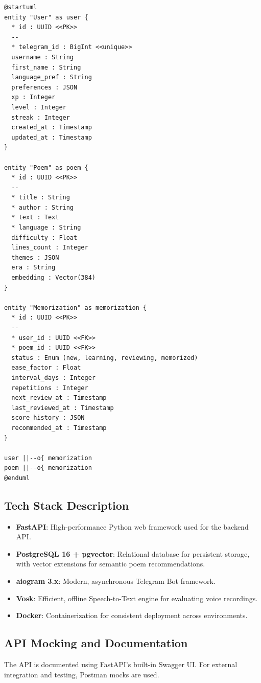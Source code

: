 \documentclass[12pt,a4paper]{article}
\begin{document}
\begin{lstlisting}[language=PlantUML, caption=PlantUML ERD Code]
@startuml
entity "User" as user {
  * id : UUID <<PK>>
  --
  * telegram_id : BigInt <<unique>>
  username : String
  first_name : String
  language_pref : String
  preferences : JSON
  xp : Integer
  level : Integer
  streak : Integer
  created_at : Timestamp
  updated_at : Timestamp
}

entity "Poem" as poem {
  * id : UUID <<PK>>
  --
  * title : String
  * author : String
  * text : Text
  * language : String
  difficulty : Float
  lines_count : Integer
  themes : JSON
  era : String
  embedding : Vector(384)
}

entity "Memorization" as memorization {
  * id : UUID <<PK>>
  --
  * user_id : UUID <<FK>>
  * poem_id : UUID <<FK>>
  status : Enum (new, learning, reviewing, memorized)
  ease_factor : Float
  interval_days : Integer
  repetitions : Integer
  next_review_at : Timestamp
  last_reviewed_at : Timestamp
  score_history : JSON
  recommended_at : Timestamp
}

user ||--o{ memorization
poem ||--o{ memorization
@enduml
\end{lstlisting}

\subsection{Tech Stack Description}
\begin{itemize}
    \item \textbf{FastAPI}: High-performance Python web framework used for the backend API.
    \item \textbf{PostgreSQL 16 + pgvector}: Relational database for persistent storage, with vector extensions for semantic poem recommendations.
    \item \textbf{aiogram 3.x}: Modern, asynchronous Telegram Bot framework.
    \item \textbf{Vosk}: Efficient, offline Speech-to-Text engine for evaluating voice recordings.
    \item \textbf{Docker}: Containerization for consistent deployment across environments.
\end{itemize}

\subsection{API Mocking and Documentation}
The API is documented using FastAPI's built-in Swagger UI. For external integration and testing, Postman mocks are used.
\end{document}
